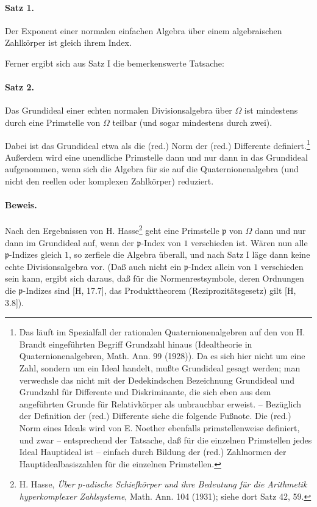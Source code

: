 \paragraph{Satz 1.}
Der Exponent einer normalen einfachen Algebra über einem algebraischen Zahlkörper ist gleich ihrem Index.

Ferner ergibt sich aus Satz I die bemerkenswerte Tatsache:

\paragraph{Satz 2.}
Das Grundideal einer echten normalen Divisionsalgebra über \(\Omega\) ist mindestens durch eine Primstelle von \(\Omega\) teilbar (und sogar mindestens durch zwei).

Dabei ist das Grundideal etwa als die (red.) Norm der (red.) Differente definiert.\footnote{Das läuft im Spezialfall der rationalen Quaternionenalgebren auf den von H. Brandt eingeführten Begriff \glqq{}Grundzahl\grqq{} hinaus (Idealtheorie in Quaternionenalgebren, Math. Ann. 99 (1928)). Da es sich hier nicht um eine Zahl, sondern um ein Ideal handelt, mußte \glqq{}Grundideal\grqq{} gesagt werden; man verwechsle das nicht mit der Dedekindschen Bezeichnung Grundideal und Grundzahl für Differente und Diskriminante, die sich eben aus dem angeführten Grunde für Relativkörper als unbrauchbar erweist. -- Bezüglich der Definition der (red.) Differente siehe die folgende Fußnote. Die (red.) Norm eines Ideals wird von E. Noether ebenfalls \glqq{}primstellenweise\grqq{} definiert, und zwar -- entsprechend der Tatsache, daß für die einzelnen Primstellen jedes Ideal Hauptideal ist -- einfach durch Bildung der (red.) Zahlnormen der Hauptidealbasiszahlen für die einzelnen Primstellen.} Außerdem wird eine unendliche Primstelle dann und nur dann in das Grundideal aufgenommen, wenn sich die Algebra für sie auf die Quaternionenalgebra (und nicht den reellen oder komplexen Zahlkörper) reduziert.

\paragraph{Beweis.}
Nach den Ergebnissen von H. Hasse\footnote{\label{fn:p38-hasse-padisch}H. Hasse, \emph{Über \(p\)-adische Schiefkörper und ihre Bedeutung für die Arithmetik hyperkomplexer Zahlsysteme}, Math. Ann. 104 (1931); siehe dort Satz 42, 59.} geht eine Primstelle \(\mathfrak p\) von \(\Omega\) dann und nur dann im Grundideal auf, wenn der \(\mathfrak p\)-Index von \(1\) verschieden ist. Wären nun alle \(\mathfrak p\)-Indizes gleich \(1\), so zerfiele die Algebra überall, und nach Satz I läge dann keine echte Divisionsalgebra vor. (Daß auch nicht ein \(\mathfrak p\)-Index allein von \(1\) verschieden sein kann, ergibt sich daraus, daß für die Normenrestsymbole, deren Ordnungen die \(\mathfrak p\)-Indizes sind [H, 17.7], das Produkttheorem (Reziprozitätsgesetz) gilt [H, 3.8]).

